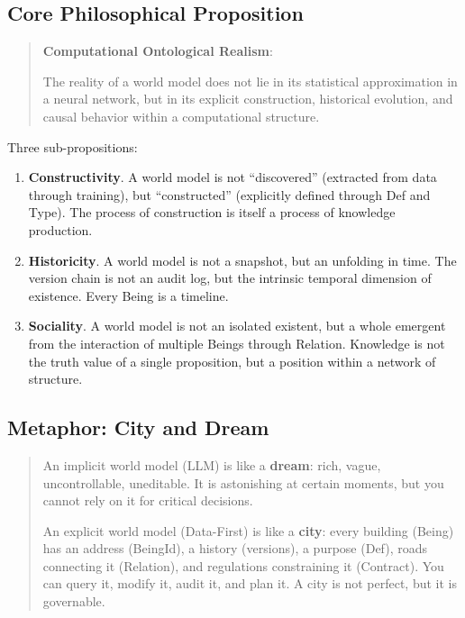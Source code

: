 \documentclass[11pt,a4paper]{article}
\begin{document}
\subsection{Core Philosophical
Proposition}\label{core-philosophical-proposition}

\begin{quote}
\textbf{Computational Ontological Realism}:

The reality of a world model does not lie in its statistical
approximation in a neural network, but in its explicit construction,
historical evolution, and causal behavior within a computational
structure.
\end{quote}

Three sub-propositions:

\begin{enumerate}
\def\labelenumi{\arabic{enumi}.}
\item
  \textbf{Constructivity}. A world model is not ``discovered''
  (extracted from data through training), but ``constructed''
  (explicitly defined through Def and Type). The process of construction
  is itself a process of knowledge production.
\item
  \textbf{Historicity}. A world model is not a snapshot, but an
  unfolding in time. The version chain is not an audit log, but the
  intrinsic temporal dimension of existence. Every Being is a timeline.
\item
  \textbf{Sociality}. A world model is not an isolated existent, but a
  whole emergent from the interaction of multiple Beings through
  Relation. Knowledge is not the truth value of a single proposition,
  but a position within a network of structure.
\end{enumerate}

\subsection{Metaphor: City and
Dream}\label{metaphor-city-and-dream}

\begin{quote}
An implicit world model (LLM) is like a \textbf{dream}: rich, vague,
uncontrollable, uneditable. It is astonishing at certain moments, but
you cannot rely on it for critical decisions.

An explicit world model (Data-First) is like a \textbf{city}: every
building (Being) has an address (BeingId), a history (versions), a
purpose (Def), roads connecting it (Relation), and regulations
constraining it (Contract). You can query it, modify it, audit it, and
plan it. A city is not perfect, but it is governable.
\end{quote}
\end{document}
